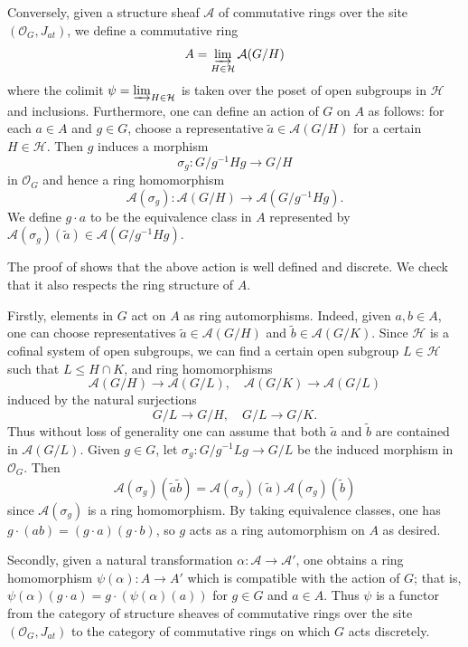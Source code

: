 \documentclass[11pt, reqno]{amsart}
\theoremstyle{plain}
\numberwithin{equation}{section}
\theoremstyle{definition}
\begin{document}
Conversely, given a structure sheaf $\mathcal{A}$ of commutative rings over the site $(\mathcal{O}_G, J_{at})$, we define a commutative ring
\[
A = \varinjlim_{H \in \mathcal{H}} \mathcal{A}(G/H)
\]
where the colimit $\psi = \varinjlim_{H \in \mathcal{H}}$ is taken over the poset of open subgroups in $\mathcal{H}$ and inclusions. Furthermore, one can define an action of $G$ on $A$ as follows: for each $a \in A$ and $g \in G$, choose a representative $\tilde{a} \in \mathcal{A}(G/H)$ for a certain $H \in \mathcal{H}$. Then $g$ induces a morphism
\[
\sigma_g: G/g^{-1}Hg \to G/H
\]
in $\mathcal{O}_G$ and hence a ring homomorphism
\[
\mathcal{A}(\sigma_g): \mathcal{A}(G/H) \to \mathcal{A}(G/g^{-1}Hg).
\]
We define $g \cdot a$ to be the equivalence class in $A$ represented by $\mathcal{A}(\sigma_g) (\tilde{a}) \in \mathcal{A}(G/g^{-1}Hg)$.

The proof of \cite[Theorem III.9.1]{MM} shows that the above action is well defined and discrete. We check that it also respects the ring structure of $A$.

Firstly, elements in $G$ act on $A$ as ring automorphisms. Indeed, given $a, b \in A$, one can choose representatives $\tilde{a} \in \mathcal{A}(G/H)$ and $\tilde{b} \in \mathcal{A}(G/K)$. Since $\mathcal{H}$ is a cofinal system of open subgroups, we can find a certain open subgroup $L \in \mathcal{H}$ such that $L \leqslant H \cap K$, and ring homomorphisms
\[
\mathcal{A}(G/H) \to \mathcal{A}(G/L), \quad \mathcal{A}(G/K) \to \mathcal{A}(G/L)
\]
induced by the natural surjections
\[
G/L \to G/H, \quad G/L \to G/K.
\]
Thus without loss of generality one can assume that both $\tilde{a}$ and $\tilde{b}$ are contained in $\mathcal{A}(G/L)$. Given $g \in G$, let $\sigma_g: G/g^{-1}Lg \to G/L$ be the induced morphism in $\mathcal{O}_G$. Then
\[
\mathcal{A} (\sigma_g) (\tilde{a} \tilde{b}) = \mathcal{A} (\sigma_g) (\tilde{a}) \mathcal{A} (\sigma_g) (\tilde{b})
\]
since $\mathcal{A} (\sigma_g)$ is a ring homomorphism. By taking equivalence classes, one has $g \cdot (ab) = (g \cdot a) (g \cdot b)$, so $g$ acts as a ring automorphism on $A$ as desired.

Secondly, given a natural transformation $\alpha: \mathcal{A} \to \mathcal{A}'$, one obtains a ring homomorphism $\psi(\alpha): A \to A'$ which is compatible with the action of $G$; that is, $\psi(\alpha) (g \cdot a) = g \cdot (\psi(\alpha)(a))$ for $g \in G$ and $a \in A$. Thus $\psi$ is a functor from the category of structure sheaves of commutative rings over the site $(\mathcal{O}_G, J_{at})$ to the category of commutative rings on which $G$ acts discretely.
\end{document}
